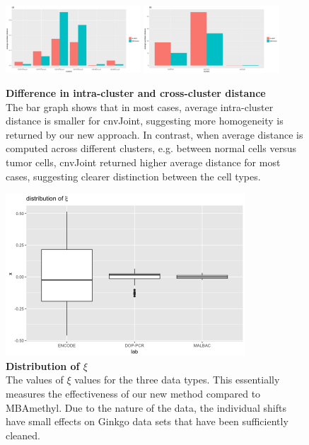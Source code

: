\documentclass[11pt]{article}
\begin{document}
\begin{figure}[h]
\centering
\includegraphics[width=0.45\textwidth]{intraclusters_bar.pdf}
\includegraphics[width=0.45\textwidth]{acrossclusters_bar.pdf}\\
\caption{\label{diff_bar}
\textbf{Difference in intra-cluster and cross-cluster distance}\\
The bar graph shows that in most cases, average intra-cluster distance is smaller for cnvJoint, suggesting more homogeneity is returned by our new approach. In contrast, when average distance is computed across different clusters, e.g. between normal cells versus tumor cells, cnvJoint returned higher average distance for most cases, suggesting clearer distinction between the cell types. 
}
\end{figure}

\begin{figure}[h]
\centering
\includegraphics[width=0.8\textwidth]{dist_xi.png}
\caption{\label{dist_xi}
\textbf{Distribution of $\xi$}\\The values of $\xi$ values for the three data types. This essentially measures the effectiveness of our new method compared to MBAmethyl. Due to the nature of the data, the individual shifts have small effects on Ginkgo data sets that have been sufficiently cleaned. 
}
\end{figure}



\end{document}
